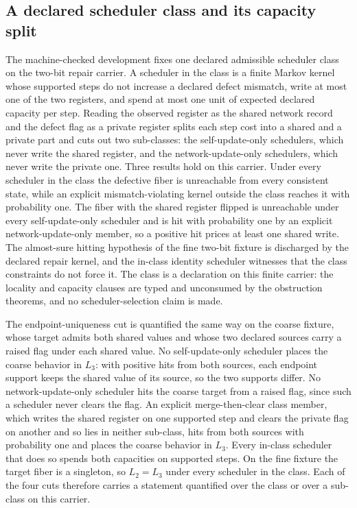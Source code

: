 \documentclass[11pt]{article}
\theoremstyle{definition}
\theoremstyle{remark}
\numberwithin{equation}{section}
\begin{document}
\subsection{A declared scheduler class and its capacity split}

The machine-checked development fixes one declared admissible scheduler
class on the two-bit repair carrier. A scheduler in the class is a finite
Markov kernel whose supported steps do not increase a declared defect
mismatch, write at most one of the two registers, and spend at most one
unit of expected declared capacity per step. Reading the observed register
as the shared network record and the defect flag as a private register
splits each step cost into a shared and a private part and cuts out two
sub-classes: the self-update-only schedulers, which never write the shared
register, and the network-update-only schedulers, which never write the
private one. Three results hold on this carrier. Under every scheduler in
the class the defective fiber is unreachable from every consistent state,
while an explicit mismatch-violating kernel outside the class reaches it
with probability one. The fiber with the shared register flipped is
unreachable under every self-update-only scheduler and is hit with
probability one by an explicit network-update-only member, so a positive
hit prices at least one shared write. The almost-sure hitting hypothesis of
the fine two-bit fixture is discharged by the declared repair kernel, and
the in-class identity scheduler witnesses that the class constraints do not
force it. The class is a declaration on this finite carrier: the locality
and capacity clauses are typed and unconsumed by the obstruction theorems,
and no scheduler-selection claim is made.

The endpoint-uniqueness cut is quantified the same way on the coarse
fixture, whose target admits both shared values and whose two declared
sources carry a raised flag under each shared value. No self-update-only
scheduler places the coarse behavior in $L_3$: with positive hits from both
sources, each endpoint support keeps the shared value of its source, so the
two supports differ. No network-update-only scheduler hits the coarse target
from a raised flag, since such a scheduler never clears the flag. An explicit
merge-then-clear class member, which writes the shared register on one
supported step and clears the private flag on another and so lies in neither
sub-class, hits from both sources with probability one and places the coarse
behavior in $L_3$. Every in-class scheduler that does so spends both
capacities on supported steps. On the fine fixture the target fiber is a
singleton, so $L_2=L_3$ under every scheduler in the class. Each of the four
cuts therefore carries a statement quantified over the class or over a
sub-class on this carrier.
\end{document}
